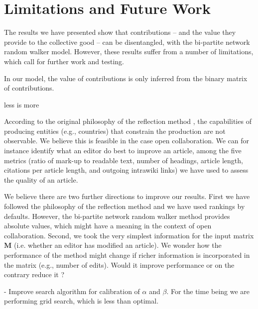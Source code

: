 \section{Limitations and Future Work}
The results we have presented show that contributions -- and the value they provide to the collective good -- can be disentangled, with the {bi-partite network random walker} model. However, these results suffer from a number of limitations, which call for further work and testing.

In our model, the value of contributions is only inferred from the binary matrix of contributions. 

less is more


According to the original philosophy of the reflection method \cite{hidalgo2007}, the capabilities of producing entities (e.g., countries) that constrain the production are not observable. We believe this is feasible in the case open collaboration. We can for instance identify what an editor do best to improve an article, among the five metrics (ratio of mark-up to readable text, number of headings, article length, citations per article length, and outgoing intrawiki links) we have used to assess the quality of an article.

We believe there are two further directions to improve our results. First we have followed the philosophy of the reflection method and we have used rankings by defaults. However, the bi-partite network random walker method provides absolute values, which might have a meaning in the context of open collaboration. Second, we took the very simplest information for the input matrix $\mathbf{M}$ (i.e. whether an editor has modified an article). We wonder how the performance of the method might change if richer information is incorporated in the matrix (e.g., number of edits). Would it improve performance or on the contrary reduce it ?

- Improve search algorithm for calibration of $\alpha$ and $\beta$. For the time being we are performing grid search, which is less than optimal.

